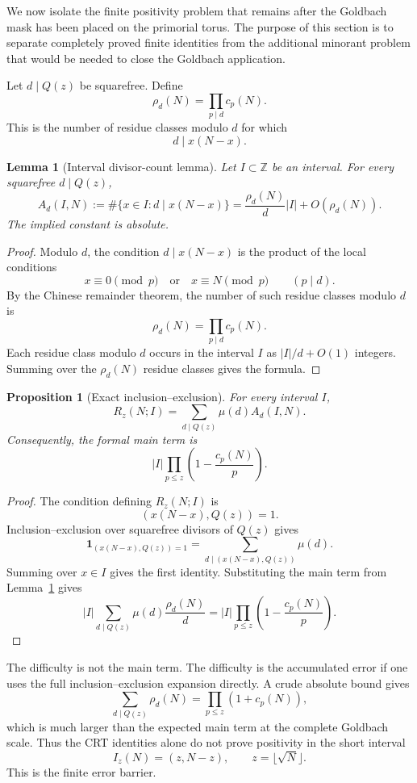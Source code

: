 \documentclass[11pt]{article}
\theoremstyle{plain}
\newtheorem{proposition}[theorem]{Proposition}
\newtheorem{lemma}[theorem]{Lemma}
\theoremstyle{definition}
\theoremstyle{remark}
\newcommand{\Z}{\mathbb Z}
\newcommand{\one}{\mathbf 1}
\begin{document}
We now isolate the finite positivity problem that remains after the Goldbach
mask has been placed on the primorial torus.  The purpose of this section is to
separate completely proved finite identities from the additional minorant problem
that would be needed to close the Goldbach application.

Let \(d\mid Q(z)\) be squarefree.  Define
\[
\rho_d(N)=\prod_{p\mid d}c_p(N).
\]
This is the number of residue classes modulo \(d\) for which
\[
d\mid x(N-x).
\]

\begin{lemma}[Interval divisor-count lemma]
\label{lem:interval_divisor_count}
Let \(I\subset\Z\) be an interval.  For every squarefree \(d\mid Q(z)\),
\[
A_d(I,N)
:=
\#\{x\in I:d\mid x(N-x)\}
=
\frac{\rho_d(N)}{d}|I|+O(\rho_d(N)).
\]
The implied constant is absolute.
\end{lemma}

\begin{proof}
Modulo \(d\), the condition \(d\mid x(N-x)\) is the product of the local
conditions
\[
x\equiv0\pmod p
\quad\text{or}\quad
x\equiv N\pmod p
\qquad (p\mid d).
\]
By the Chinese remainder theorem, the number of such residue classes modulo
\(d\) is
\[
\rho_d(N)=\prod_{p\mid d}c_p(N).
\]
Each residue class modulo \(d\) occurs in the interval \(I\) as
\(|I|/d+O(1)\) integers.  Summing over the \(\rho_d(N)\) residue classes gives
the formula.
\end{proof}

\begin{proposition}[Exact inclusion--exclusion]
\label{prop:exact_ie}
For every interval \(I\),
\[
R_z(N;I)=\sum_{d\mid Q(z)}\mu(d)A_d(I,N).
\]
Consequently, the formal main term is
\[
|I|\prod_{p\le z}\left(1-\frac{c_p(N)}p\right).
\]
\end{proposition}

\begin{proof}
The condition defining \(R_z(N;I)\) is
\[
(x(N-x),Q(z))=1.
\]
Inclusion--exclusion over squarefree divisors of \(Q(z)\) gives
\[
\one_{(x(N-x),Q(z))=1}
=
\sum_{d\mid (x(N-x),Q(z))}\mu(d).
\]
Summing over \(x\in I\) gives the first identity.  Substituting the main term
from Lemma~\ref{lem:interval_divisor_count} gives
\[
|I|\sum_{d\mid Q(z)}\mu(d)\frac{\rho_d(N)}d
=
|I|\prod_{p\le z}\left(1-\frac{c_p(N)}p\right).
\]
\end{proof}

The difficulty is not the main term.  The difficulty is the accumulated error if
one uses the full inclusion--exclusion expansion directly.  A crude absolute
bound gives
\[
\sum_{d\mid Q(z)}\rho_d(N)
=
\prod_{p\le z}(1+c_p(N)),
\]
which is much larger than the expected main term at the complete Goldbach scale.
Thus the CRT identities alone do not prove positivity in the short interval
\[
I_z(N)=(z,N-z),
\qquad z=\lfloor\sqrt N\rfloor.
\]
This is the finite error barrier.
\end{document}
